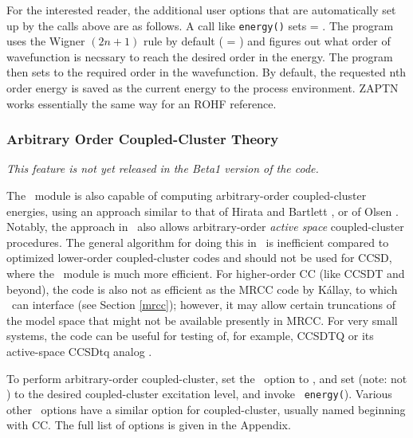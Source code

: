 For the interested reader, the additional user options that are
automatically set up by the calls above are as follows.  A call like
{\tt energy(\qq)} sets  = .
The program uses the Wigner $(2n+1)$ rule by default (
= ) and figures out what order of wavefunction is
necssary to reach the desired order in the energy.  The program then
sets  to the required order in the wavefunction.
By default, the requested n{th} order energy is saved as the current
energy to the process environment.   ZAPTN works essentially the same
way for an ROHF reference.

\subsubsection{Arbitrary Order Coupled-Cluster Theory} 
{\em This feature is not yet released in the Beta1 version of the code.}

The \PSIdetci\ module is also capable of computing arbitrary-order
coupled-cluster energies, using an approach similar to that of Hirata
and Bartlett \cite{Hirata:2000:216}, or of Olsen \cite{Olsen:2000:7140}.
Notably, the approach in \PSIdetci\ also allows arbitrary-order {\em
active space} coupled-cluster procedures.  The general algorithm
for doing this in \PSIdetci\ is inefficient compared to optimized
lower-order coupled-cluster codes and should not be used for CCSD,
where the \PSIccenergy\ module is much more efficient.  For higher-order
CC (like CCSDT and beyond), the code is also not as efficient as the
MRCC code by K{\'a}llay, to which \PSIfour\ can interface (see Section
\ref{mrcc}); however, it may allow certain truncations of the model
space that might not be available presently in MRCC.  For very small
systems, the code can be useful for testing of, for example, CCSDTQ or
its active-space CCSDtq analog \cite{Piecuch:1999:6103}.

To perform arbitrary-order coupled-cluster, set the \PSIdetci\
option  to , and set
 (note: not )
to the desired coupled-cluster excitation level, and invoke {\tt
energy(\qq{detci}\qq}).  Various other \PSIdetci\ options have a similar
option for coupled-cluster, usually named beginning with CC.  The full
list of options is given in the Appendix.


